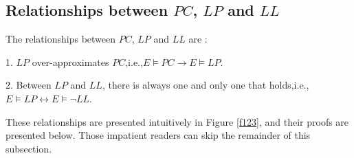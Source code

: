 \documentclass[journal]{IEEEtran}
\begin{document}



\subsection{Relationships between $PC$, $LP$ and $LL$}\label{subsec_relproof}

The relationships between $PC$, $LP$ and $LL$ are :

1. $LP$ over-approximates $PC$,i.e.,$E\vDash PC\to E\vDash LP$.

2. Between $LP$ and $LL$,
there is always one and only one that holds,i.e.,$E\vDash LP\leftrightarrow E\vDash\neg LL$.


These relationships are presented intuitively in Figure \ref{f123},
and their proofs are presented below.
Those impatient readers can skip the remainder of this subsection.

%
%
%
\end{document}
